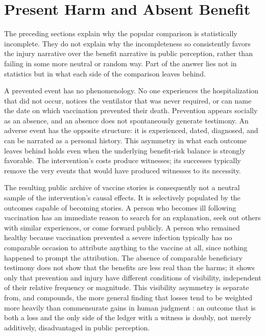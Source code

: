\documentclass[11pt]{article}
\begin{document}
\section{Present Harm and Absent Benefit}

The preceding sections explain why the popular comparison is statistically incomplete. They do not explain why the incompleteness so consistently favors the injury narrative over the benefit narrative in public perception, rather than failing in some more neutral or random way. Part of the answer lies not in statistics but in what each side of the comparison leaves behind.

A prevented event has no phenomenology. No one experiences the hospitalization that did not occur, notices the ventilator that was never required, or can name the date on which vaccination prevented their death. Prevention appears socially as an absence, and an absence does not spontaneously generate testimony. An adverse event has the opposite structure: it is experienced, dated, diagnosed, and can be narrated as a personal history. This asymmetry in what each outcome leaves behind holds even when the underlying benefit-risk balance is strongly favorable. The intervention's costs produce witnesses; its successes typically remove the very events that would have produced witnesses to its necessity.

The resulting public archive of vaccine stories is consequently not a neutral sample of the intervention's causal effects. It is selectively populated by the outcomes capable of becoming stories. A person who becomes ill following vaccination has an immediate reason to search for an explanation, seek out others with similar experiences, or come forward publicly. A person who remained healthy because vaccination prevented a severe infection typically has no comparable occasion to attribute anything to the vaccine at all, since nothing happened to prompt the attribution. The absence of comparable beneficiary testimony does not show that the benefits are less real than the harms; it shows only that prevention and injury have different conditions of visibility, independent of their relative frequency or magnitude. This visibility asymmetry is separate from, and compounds, the more general finding that losses tend to be weighted more heavily than commensurate gains in human judgment \citep{kahneman1979}: an outcome that is both a loss and the only side of the ledger with a witness is doubly, not merely additively, disadvantaged in public perception.
\end{document}
